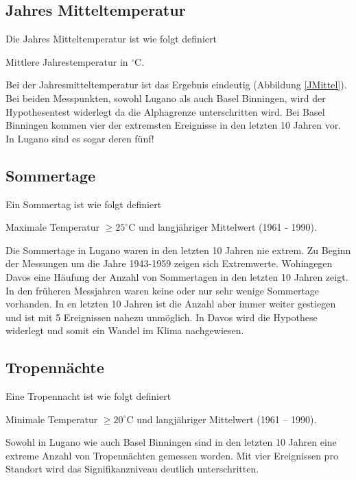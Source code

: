 \begin{refsection}
\subsection{Jahres Mitteltemperatur}
Die Jahres Mitteltemperatur ist wie folgt definiert

\begin{definition}
Mittlere Jahrestemperatur in $^{\circ}$C.
\end{definition}

Bei der Jahresmitteltemperatur ist das Ergebnis eindeutig (Abbildung \ref{JMittel}). Bei beiden Messpunkten, sowohl Lugano als auch Basel Binningen, wird der Hypothesentest widerlegt da die Alphagrenze unterschritten wird. Bei Basel Binningen kommen vier der extremsten Ereignisse in den letzten 10 Jahren vor. In Lugano sind es sogar deren fünf! 


\subsection{Sommertage}
Ein Sommertag ist wie folgt definiert

\begin{definition}
Maximale Temperatur $\ge 25^{\circ}$C und langjähriger Mittelwert (1961 - 1990).
\end{definition}

Die Sommertage in Lugano waren in den letzten 10 Jahren nie extrem. Zu Beginn der Messungen um die Jahre 1943-1959 zeigen sich Extremwerte. Wohingegen Davos eine Häufung der Anzahl von Sommertagen in den letzten 10 Jahren zeigt. In den früheren Messjahren waren keine oder nur sehr wenige Sommertage vorhanden. In en letzten 10 Jahren ist die Anzahl aber immer weiter gestiegen und ist mit 5 Ereignissen nahezu unmöglich. In Davos wird die Hypothese widerlegt und somit ein Wandel im Klima nachgewiesen.


\subsection{Tropennächte}
Eine Tropennacht ist wie folgt definiert

\begin{definition}
Minimale Temperatur $\ge 20^{\circ}$C und langjähriger Mittelwert (1961 -- 1990).
\end{definition}

Sowohl in Lugano wie auch Basel Binningen sind in den letzten 10 Jahren eine extreme Anzahl von Tropennächten gemessen worden. Mit vier Ereignissen pro Standort wird das Signifikanzniveau deutlich unterschritten.



\end{refsection}

